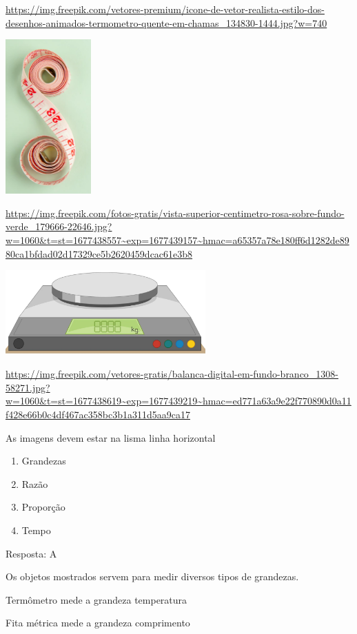 \url{https://img.freepik.com/vetores-premium/icone-de-vetor-realista-estilo-dos-desenhos-animados-termometro-quente-em-chamas_134830-1444.jpg?w=740}

\includegraphics[width=1.29167in,height=2.33463in]{media/image129.png}

\url{https://img.freepik.com/fotos-gratis/vista-superior-centimetro-rosa-sobre-fundo-verde_179666-22646.jpg?w=1060\&t=st=1677438557~exp=1677439157~hmac=a65357a78e180ff6d1282de8980ca1bfdad02d17329ce5b2620459dcac61e3b8}

\includegraphics[width=3.02500in,height=1.27488in]{media/image130.png}

\url{https://img.freepik.com/vetores-gratis/balanca-digital-em-fundo-branco_1308-58271.jpg?w=1060\&t=st=1677438619~exp=1677439219~hmac=ed771a63a9e22f770890d0a11f428e66b0c4df467ac358bc3b1a311d5aa9ca17}

As imagens devem estar na lisma linha horizontal

\begin{enumerate}
\def\labelenumi{\alph{enumi})}
\item
  Grandezas
\item
  Razão
\item
  Proporção
\item
  Tempo
\end{enumerate}

Resposta: A

Os objetos mostrados servem para medir diversos tipos de grandezas.

Termômetro mede a grandeza temperatura

Fita métrica mede a grandeza comprimento

